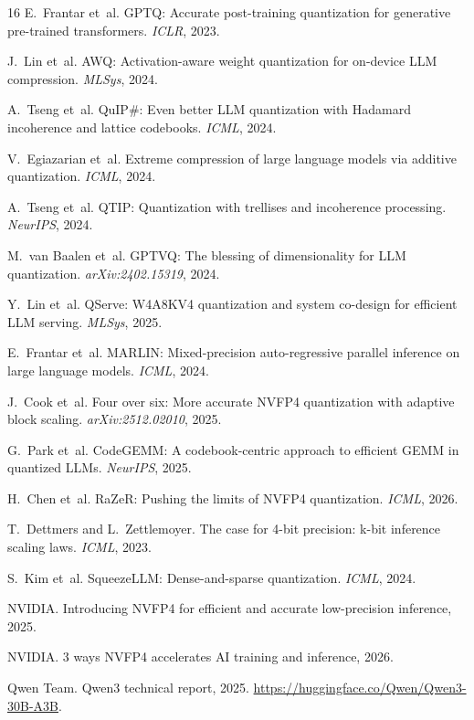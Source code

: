 \documentclass[11pt,a4paper]{article}
\begin{document}
\begin{thebibliography}{16}
E.~Frantar et~al. {GPTQ}: Accurate post-training quantization for generative pre-trained transformers. \emph{ICLR}, 2023.

J.~Lin et~al. {AWQ}: Activation-aware weight quantization for on-device {LLM} compression. \emph{MLSys}, 2024.

A.~Tseng et~al. {QuIP\#}: Even better {LLM} quantization with {Hadamard} incoherence and lattice codebooks. \emph{ICML}, 2024.

V.~Egiazarian et~al. Extreme compression of large language models via additive quantization. \emph{ICML}, 2024.

A.~Tseng et~al. {QTIP}: Quantization with trellises and incoherence processing. \emph{NeurIPS}, 2024.

M.~van Baalen et~al. {GPTVQ}: The blessing of dimensionality for {LLM} quantization. \emph{arXiv:2402.15319}, 2024.

Y.~Lin et~al. {QServe}: {W4A8KV4} quantization and system co-design for efficient {LLM} serving. \emph{MLSys}, 2025.

E.~Frantar et~al. {MARLIN}: Mixed-precision auto-regressive parallel inference on large language models. \emph{ICML}, 2024.

J.~Cook et~al. Four over six: More accurate {NVFP4} quantization with adaptive block scaling. \emph{arXiv:2512.02010}, 2025.

G.~Park et~al. {CodeGEMM}: A codebook-centric approach to efficient {GEMM} in quantized {LLMs}. \emph{NeurIPS}, 2025.

H.~Chen et~al. {RaZeR}: Pushing the limits of {NVFP4} quantization. \emph{ICML}, 2026.

T.~Dettmers and L.~Zettlemoyer. The case for 4-bit precision: k-bit inference scaling laws. \emph{ICML}, 2023.

S.~Kim et~al. {SqueezeLLM}: Dense-and-sparse quantization. \emph{ICML}, 2024.

{NVIDIA}. Introducing {NVFP4} for efficient and accurate low-precision inference, 2025.

{NVIDIA}. 3 ways {NVFP4} accelerates {AI} training and inference, 2026.

{Qwen Team}. Qwen3 technical report, 2025. \url{https://huggingface.co/Qwen/Qwen3-30B-A3B}.
\end{thebibliography}
\end{document}
